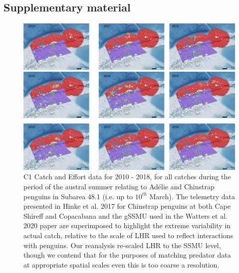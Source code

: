 \documentclass[]{elsarticle} %
\newcommand{\blandscape}{\begin{landscape}}
\newcommand{\elandscape}{\end{landscape}}
\newcommand{\beginsupplement}{\setcounter{table}{0}  \renewcommand{\thetable}{S\arabic{table}}     \setcounter{figure}{0} \renewcommand{\thefigure}{S\arabic{figure}}}
\begin{document}
\newpage  
\beginsupplement
\blandscape

\hypertarget{supplementary-material}{%
\section{Supplementary material}\label{supplementary-material}}

\begin{figure}
\includegraphics[width=0.8\linewidth]{./Watters EMM figures/summer catch/Year by year catch} \caption{C1 Catch and Effort data for 2010 - 2018, for all catches during the period of the austral summer relating to Adélie and Chinstrap penguins in Subarea 48.1 (i.e. up to $10^{th}$ March).  The telemetry data presented in Hinke et al. 2017 for Chinstrap penguins at both Cape Shireff and Copacabana and the gSSMU used in the Watters et al. 2020 paper are superimposed to highlight the extreme variability in actual catch, relative to the scale of LHR used to reflect interactions with penguins.  Our reanalysis re-scaled LHR to the SSMU level, though we contend that for the purposes of matching predator data at appropriate spatial scales even this is too coarse a resolution.}\label{fig:Supplementary Figure 1}
\end{figure}
\elandscape
\end{document}

